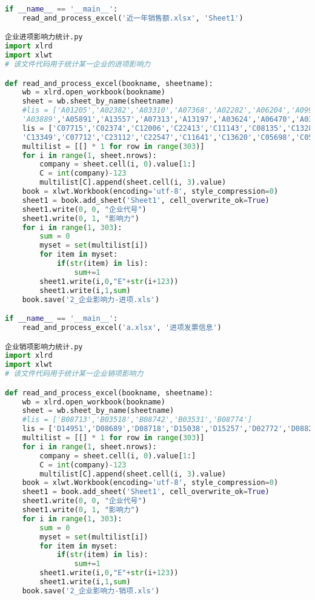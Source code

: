 \documentclass[withoutpreface,bwprint]{cumcmthesis}
\begin{document}
\begin{appendices}
\begin{lstlisting}[language=python]
if __name__ == '__main__':
    read_and_process_excel('近一年销售额.xlsx', 'Sheet1')

企业进项影响力统计.py
import xlrd
import xlwt
# 该文件代码用于统计某一企业的进项影响力

def read_and_process_excel(bookname, sheetname):
    wb = xlrd.open_workbook(bookname)
    sheet = wb.sheet_by_name(sheetname)
    #lis = ['A01205','A02382','A03310','A07368','A02282','A06204','A09920','A13655','A13116',
    'A03889','A05891','A13557','A07313','A13197','A03624','A06470','A03626','A00370','A07242']
    lis = ['C07715','C02374','C12006','C22413','C11143','C08135','C13284','C17386','C23259',
    'C13349','C07712','C23112','C22547','C11641','C13620','C05698','C05866','C11851','C07293']
    multilist = [[] * 1 for row in range(303)]
    for i in range(1, sheet.nrows):
        company = sheet.cell(i, 0).value[1:]
        C = int(company)-123
        multilist[C].append(sheet.cell(i, 3).value)
    book = xlwt.Workbook(encoding='utf-8', style_compression=0)
    sheet1 = book.add_sheet('Sheet1', cell_overwrite_ok=True)
    sheet1.write(0, 0, "企业代号")
    sheet1.write(0, 1, "影响力")
    for i in range(1, 303):
        sum = 0
        myset = set(multilist[i])
        for item in myset:
            if(str(item) in lis):
                sum+=1
        sheet1.write(i,0,"E"+str(i+123))
        sheet1.write(i,1,sum)
    book.save('2_企业影响力-进项.xls')

if __name__ == '__main__':
    read_and_process_excel('a.xlsx', '进项发票信息')

企业销项影响力统计.py
import xlrd
import xlwt
# 该文件代码用于统计某一企业销项影响力

def read_and_process_excel(bookname, sheetname):
    wb = xlrd.open_workbook(bookname)
    sheet = wb.sheet_by_name(sheetname)
    #lis = ['B08713','B03518','B08742','B03531','B08774']
    lis = ['D14951','D08689','D08718','D15038','D15257','D02772','D08821']
    multilist = [[] * 1 for row in range(303)]
    for i in range(1, sheet.nrows):
        company = sheet.cell(i, 0).value[1:]
        C = int(company)-123
        multilist[C].append(sheet.cell(i, 3).value)
    book = xlwt.Workbook(encoding='utf-8', style_compression=0)
    sheet1 = book.add_sheet('Sheet1', cell_overwrite_ok=True)
    sheet1.write(0, 0, "企业代号")
    sheet1.write(0, 1, "影响力")
    for i in range(1, 303):
        sum = 0
        myset = set(multilist[i])
        for item in myset:
            if(str(item) in lis):
                sum+=1
        sheet1.write(i,0,"E"+str(i+123))
        sheet1.write(i,1,sum)
    book.save('2_企业影响力-销项.xls')


\end{lstlisting}
\end{appendices}
\end{document}
